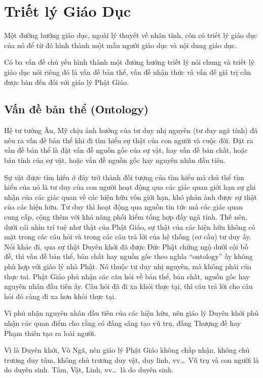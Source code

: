 \chapter{Triết lý Giáo Dục} %
\label{cha:triet_ly_giao_duc}

Một đường hướng giáo dục, ngoài lý thuyết về nhân tính, còn có triết lý giáo dục của nó để từ đó hình thành một mẫu người giáo dục và nội dung giáo dục.

Có ba vấn đề chủ yếu hình thành một đường hướng triết lý nói chung và triết lý giáo dục nói riêng đó là vấn đề bản thể, vấn đề nhận thức và vấn đề giá trị cần được bàn đến đối với giáo lý Phật Giáo.

\section{Vấn đề bản thể (Ontology)} %
\label{sec:van_de_ban_the}

Hệ tư tưởng Âu, Mỹ chịu ảnh hưởng của tư duy nhị nguyên (tư duy ngã tính) đã nêu ra vấn đề bản thể khi đi tìm hiểu sự thật của con người và cuộc đời. Đặt ra vấn đề bản thể là đặt vấn đề nguồn gốc của sự vật, hay vấn đề bản chất, hoặc bản tính của sự vật, hoặc vấn đề nguồn gốc hay nguyên nhân đầu tiên.

Sự vật được tìm hiểu ở đây trở thành đối tượng của tìm hiểu mà chủ thể tìm hiểu của nó là tư duy của con người hoạt động qua các giác quan giới hạn sự ghi nhận của các giác quan về các hiện hữu vốn giới hạn, khó phản ảnh được sự thật của các hiện hữu. Tư duy thì hoạt động qua nguồn tin tức mà các giác quan cung cấp, cộng thêm với khả năng phối kiểm tổng hợp đầy ngã tính. Thế nên, dưới cái nhìn trí tuệ như thật của Phật Giáo, sự thật của các hiện hữu không có mặt trong các câu hỏi và trong các câu trả lời của hệ thống (cơ cấu) tư duy ấy. Nói khác đi, qua sự thật Duyên khởi đã được Đức Phật chứng ngộ dưới cội bồ đề, thì vấn đề bản thể, bản chất hay nguồn gốc theo nghĩa ``ontology'' ấy không phù hợp với giáo lý nhà Phật. Nó thuộc tư duy nhị nguyên, mà không phải của thực tai. Phật Giáo phủ nhận các câu hỏi về bản thể, bản chất, nguồn gốc hay nguyên nhân đầu tiên ấy. Câu hỏi đã đi xa khỏi thực tại, thì câu trả lời cho câu hỏi đó càng đi xa hơn khỏi thực tại.

Vì phủ nhận nguyên nhân đầu tiên của các hiện hữu, nên giáo lý Duyên khởi phủ nhận các quan điểm cho rằng có đấng sáng tạo vũ trụ, đấng Thượng đế hay Phạm thiên tạo ra loài người.

Vì là Duyên khởi, Vô Ngã, nên giáo lý Phật Giáo không chấp nhận, không chủ trương duy tâm, không chủ trương duy vật, duy linh, vv\ldots ~Vũ trụ và con người là do duyên sinh. Tâm, Vật, Linh, vv\ldots ~là do duyên sinh.

